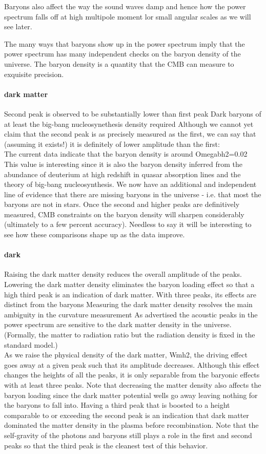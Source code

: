 \documentclass{article}
\begin{document}
Baryons also affect the way the sound waves damp and hence how the power spectrum falls off at high multipole moment lor small angular scales as we will see later.

The many ways that baryons show up in the power spectrum imply that the power spectrum has many independent checks on the baryon density of the universe.  The baryon density is a quantity that the CMB can measure to exquisite precision.

\paragraph{dark matter}
Second peak is observed to be substantially lower than first peak
Dark baryons of at least the big-bang nucleosynethesis density required
Although we cannot yet claim that the second peak is as precisely measured as the first, we can say that (assuming it exists!) it is definitely of lower amplitude than the first:\\
The current data indicate that the baryon density is around Omegabh2=0.02 This value is interesting since it is also the baryon density inferred from the abundance of deuterium at high redshift in quasar absorption lines and the theory of big-bang nucleosynthesis.  We now have an additional and independent line of evidence that there are missing baryons in the universe - i.e. that most the baryons are not in stars.   Once the second and higher peaks are definitively measured, CMB constraints on the baryon density will sharpen considerably (ultimately to a few percent accuracy).  Needless to say it will be interesting to see how these comparisons shape up as the data improve.
\paragraph{dark}
Raising the dark matter density reduces the overall amplitude of the peaks.
Lowering the dark matter density eliminates the baryon loading effect so that a high third peak is an indication of dark matter.
With three peaks, its effects are distinct from the baryons
Measuring the dark matter density resolves the main ambiguity in the curvature measurement
As advertised the acoustic peaks in the power spectrum are sensitive to the dark matter density in the universe.  (Formally, the matter to radiation ratio but the radiation density is fixed in the standard model.)\\
As we raise the physical density of the dark matter, Wmh2, the driving effect goes away at a given peak such that its amplitude decreases.  Although this effect changes the heights of all the peaks, it is only separable from the baryonic effects with at least three peaks.  Note that decreasing the matter density also affects the baryon loading since the dark matter potential wells go away leaving nothing for the baryons to fall into. Having a third peak that is boosted to a height comparable to or exceeding the second peak is an indication that dark matter dominated the matter density in the plasma before recombination. Note that the self-gravity of the photons and baryons still plays a role in the first and second peaks so that the third peak is the cleanest test of this behavior.
\end{document}
